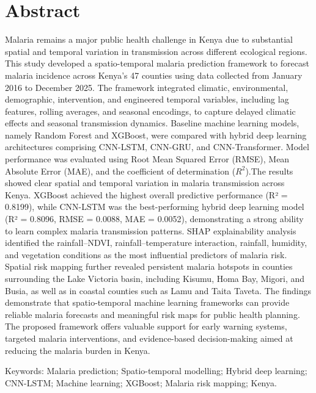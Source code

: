 \chapter*{Abstract} 
Malaria remains a major public health challenge in Kenya due to substantial spatial and temporal variation in transmission across different ecological regions. This study developed a spatio-temporal malaria prediction framework to forecast malaria incidence across Kenya’s 47 counties using data collected from January 2016 to December 2025. The framework integrated climatic, environmental, demographic, intervention, and engineered temporal variables, including lag features, rolling averages, and seasonal encodings, to capture delayed climatic effects and seasonal transmission dynamics. Baseline machine learning models, namely Random Forest and XGBoost, were compared with hybrid deep learning architectures comprising CNN-LSTM, CNN-GRU, and CNN-Transformer. Model performance was evaluated using Root Mean Squared Error (RMSE), Mean Absolute Error (MAE), and the coefficient of determination ($R^2$).The results showed clear spatial and temporal variation in malaria transmission across Kenya. XGBoost achieved the highest overall predictive performance (R² = 0.8199), while CNN-LSTM was the best-performing hybrid deep learning model (R² = 0.8096, RMSE = 0.0088, MAE = 0.0052), demonstrating a strong ability to learn complex malaria transmission patterns. SHAP explainability analysis identified the rainfall–NDVI, rainfall–temperature interaction, rainfall, humidity, and vegetation conditions as the most influential predictors of malaria risk. Spatial risk mapping further revealed persistent malaria hotspots in counties surrounding the Lake Victoria basin, including Kisumu, Homa Bay, Migori, and Busia, as well as in coastal counties such as Lamu and Taita Taveta. The findings demonstrate that spatio-temporal machine learning frameworks can provide reliable malaria forecasts and meaningful risk maps for public health planning. The proposed framework offers valuable support for early warning systems, targeted malaria interventions, and evidence-based decision-making aimed at reducing the malaria burden in Kenya.


Keywords: Malaria prediction; Spatio-temporal modelling; Hybrid deep learning; CNN-LSTM; Machine learning; XGBoost; Malaria risk mapping; Kenya.



